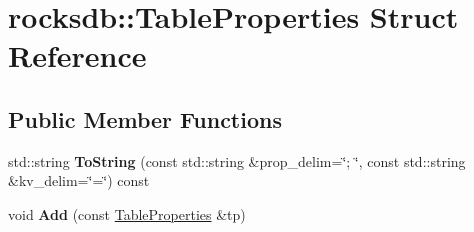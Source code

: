 \hypertarget{structrocksdb_1_1TableProperties}{}\section{rocksdb\+:\+:Table\+Properties Struct Reference}
\label{structrocksdb_1_1TableProperties}
\subsection*{Public Member Functions}
\begin{DoxyCompactItemize}
\item 
std\+::string {\bfseries To\+String} (const std\+::string \&prop\+\_\+delim=\char`\"{}; \char`\"{}, const std\+::string \&kv\+\_\+delim=\char`\"{}=\char`\"{}) const\hypertarget{structrocksdb_1_1TableProperties_a1765630751c3f5bdd6c617f4b44ee858}{}\label{structrocksdb_1_1TableProperties_a1765630751c3f5bdd6c617f4b44ee858}

\item 
void {\bfseries Add} (const \hyperlink{structrocksdb_1_1TableProperties}{Table\+Properties} \&tp)\hypertarget{structrocksdb_1_1TableProperties_acb38cadf3f051101f2a61c6385f57147}{}\label{structrocksdb_1_1TableProperties_acb38cadf3f051101f2a61c6385f57147}

\end{DoxyCompactItemize}

